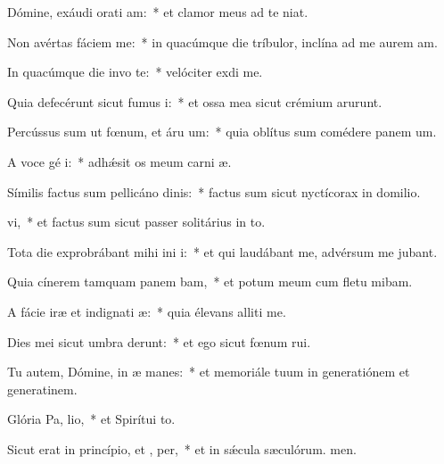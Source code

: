 \item Dómine, exáudi orati am:~* et clamor meus ad te niat.
\item Non avértas fáciem   me:~* in quacúmque die tríbulor, inclína ad me aurem am.
\item In quacúmque die invo te:~* velóciter exdi me.
\item Quia defecérunt sicut fumus  i:~* et ossa mea sicut crémium arurunt.
\item Percússus sum ut fœnum, et áru  um:~* quia oblítus sum comédere panem um.
\item A voce gé i:~* adhǽsit os meum carni æ.
\item Símilis factus sum pellicáno dinis:~* factus sum sicut nyctícorax in domilio.
\item {}vi,~* et factus sum sicut passer solitárius in to.
\item Tota die exprobrábant mihi ini i:~* et qui laudábant me, advérsum me jubant.
\item Quia cínerem tamquam panem bam,~* et potum meum cum fletu mibam.
\item A fácie iræ et indignati æ:~* quia élevans alliti me.
\item Dies mei sicut umbra derunt:~* et ego sicut fœnum rui.
\item Tu autem, Dómine, in æ manes:~* et memoriále tuum in generatiónem et generatinem.
\item Glória Pa,  lio,~* et Spirítui to.
\item Sicut erat in princípio, et ,  per,~* et in sǽcula sæculórum. men.
